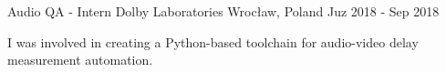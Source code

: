 \begin{cventries}
  \cventry
  {Audio QA - Intern} %
  {Dolby Laboratories} %
  {Wrocław, Poland} %
  {Juz 2018 - Sep 2018} %
  {
    \begin{cvitems} %
      \item {I was involved in creating a Python-based toolchain for audio-video delay measurement automation.}
    \end{cvitems}
  }

\end{cventries}
